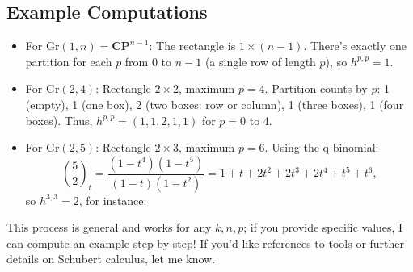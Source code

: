 \documentclass{amsart}
\theoremstyle{plain}
\theoremstyle{definition}
\theoremstyle{remark}
\begin{document}
\subsection{Example Computations}

\begin{itemize}
	\item For $\mathrm{Gr}(1, n) = \mathbf{CP}^{n-1}$: The rectangle is $1 \times (n-1)$. There's exactly one partition for each $p$ from 0 to $n-1$ (a single row of length $p$), so $h^{p,p} = 1$.
	\item For $\mathrm{Gr}(2,4)$: Rectangle $2 \times 2$, maximum $p=4$. Partition counts by $p$: 1 (empty), 1 (one box), 2 (two boxes: row or column), 1 (three boxes), 1 (four boxes). Thus, $h^{p,p} = (1,1,2,1,1)$ for $p=0$ to 4.
	\item For $\mathrm{Gr}(2,5)$: Rectangle $2 \times 3$, maximum $p=6$. Using the q-binomial:
\[
\binom{5}{2}_t = \frac{(1-t^4)(1-t^5)}{(1-t)(1-t^2)} = 1 + t + 2t^2 + 2t^3 + 2t^4 + t^5 + t^6,
\]so $h^{3,3} = 2$, for instance.
\end{itemize}

This process is general and works for any $k, n, p$; if you provide specific values, I can compute an example step by step! If you'd like references to tools or further details on Schubert calculus, let me know.
\end{document}
